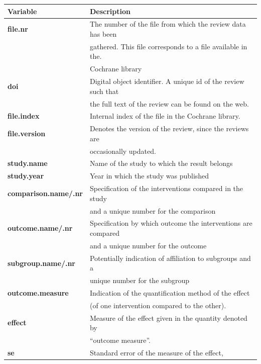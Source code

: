 \documentclass[11pt,a4paper,twoside]{book}\usepackage[]{graphicx}\usepackage[]{color}
\begin{document}
\begin{table}[ht]
  \begin{center}
    \begin{tabular}{l l}
      \textbf{Variable} & \textbf{Description}\\
      \hline
      \textbf{file.nr} & The number of the file from which the review data has been \\&gathered. This file corresponds to a file available in the. \\& Cochrane library\\
      \textbf{doi} & Digital object identifier. A unique id of the review such that  \\ &the full text of the review can be found on the web.\\
      \textbf{file.index} & Internal index of the file in the Cochrane library.\\
      \textbf{file.version} & Denotes the version of the review, since the reviews are \\ &occasionally updated.\\
      \hline
      \textbf{study.name} & Name of the study to which the result belongs\\
      \textbf{study.year} & Year in which the study was published\\
      \hline
      \textbf{comparison.name/.nr} & Specification of the interventions compared in the study  \\ &and a unique number for the comparison\\
      \textbf{outcome.name/.nr} & Specification by which outcome the interventions are compared\\ &and a unique number for the outcome\\
      \textbf{subgroup.name/.nr} & Potentially indication of affiliation to subgroups and a \\ &unique number for the subgroup\\
      \textbf{outcome.measure} & Indication of the quantification method of the effect \\ &(of one intervention compared to the other).\\
      \textbf{effect} & Measure of the effect given in the quantity denoted by \\ &``outcome measure''.\\
      \textbf{se} & Standard error of the measure of the effect,\\

\end{tabular}
\end{center}
\end{table}
\end{document}
